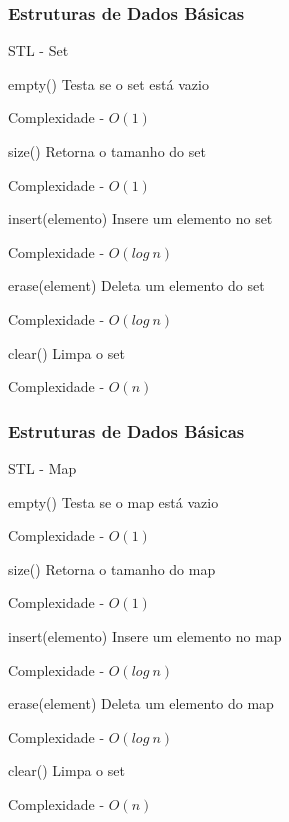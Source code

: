 \begin{frame}
\frametitle{Estruturas de Dados Básicas}
\begin{block}{STL - Set}
\begin{itemize}
	\bitem empty() Testa se o set está vazio
	\begin{itemize}
		\bitem Complexidade - $O(1)$
	\end{itemize}
	\bitem size() Retorna o tamanho do set
	\begin{itemize}
		\bitem Complexidade - $O(1)$
	\end{itemize}
	\bitem insert(elemento) Insere um elemento no set
	\begin{itemize}
		\bitem Complexidade - $O(log\ n)$
	\end{itemize}
	\bitem erase(element) Deleta um elemento do set
	\begin{itemize}
		\bitem Complexidade - $O(log\ n)$
	\end{itemize}
	\bitem clear() Limpa o set
	\begin{itemize}
		\bitem Complexidade - $O(n)$
	\end{itemize}
\end{itemize}
\end{block}
\end{frame}

\begin{frame}
\frametitle{Estruturas de Dados Básicas}
\begin{block}{STL - Map}
\begin{itemize}
	\bitem empty() Testa se o map está vazio
	\begin{itemize}
		\bitem Complexidade - $O(1)$
	\end{itemize}
	\bitem size() Retorna o tamanho do map
	\begin{itemize}
		\bitem Complexidade - $O(1)$
	\end{itemize}
	\bitem insert(elemento) Insere um elemento no map
	\begin{itemize}
		\bitem Complexidade - $O(log\ n)$
	\end{itemize}
	\bitem erase(element) Deleta um elemento do map
	\begin{itemize}
		\bitem Complexidade - $O(log\ n)$
	\end{itemize}
	\bitem clear() Limpa o set
	\begin{itemize}
		\bitem Complexidade - $O(n)$
	\end{itemize}
\end{itemize}
\end{block}
\end{frame}

